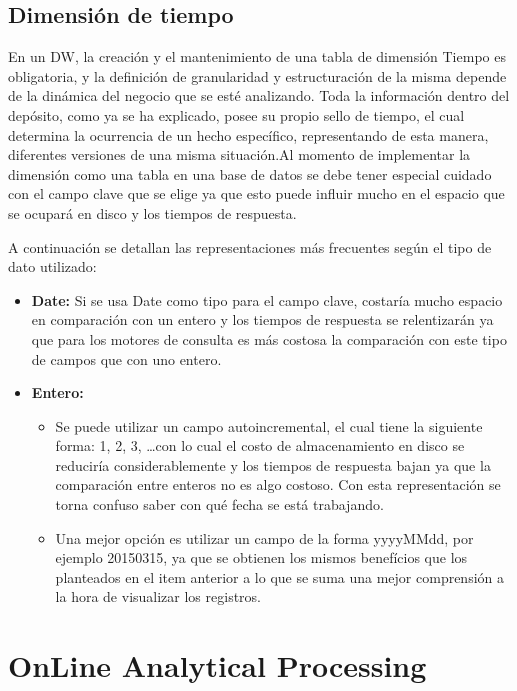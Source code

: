 \documentclass[a4paper,11pt]{article}
\begin{document}
\begin{flushleft}
    
    \subsection{Dimensión de tiempo}
    
    En un DW, la creación y el mantenimiento de una tabla de dimensión Tiempo es obligatoria, y la definición de granularidad y estructuración de la misma 
    depende de la dinámica del negocio que se esté analizando. Toda la información dentro del depósito, como ya se ha explicado, posee su propio sello de 
    tiempo, el cual determina la ocurrencia de un hecho específico, representando de esta manera, diferentes versiones de una misma situación.Al momento de 
    implementar la dimensión como una tabla en una base de datos se debe tener especial cuidado con el campo clave que se elige ya que esto puede influir 
    mucho en el espacio que se ocupará en disco y los tiempos de respuesta.\par
    
    A continuación se detallan las representaciones más frecuentes según el tipo de dato utilizado:
    
    \begin{itemize}
      \item \textbf{Date:} Si se usa Date como tipo para  el campo clave, costaría mucho espacio en comparación con un entero y los tiempos de respuesta se
      relentizarán ya que para los motores de consulta es más costosa la comparación con este tipo de campos que con uno entero.
      \item \textbf{Entero:}
      \begin{itemize}
        \item Se puede utilizar un campo autoincremental, el cual tiene la siguiente forma: 1, 2, 3, \dots con lo cual el costo de almacenamiento en disco
        se reduciría considerablemente y los tiempos de respuesta bajan ya que la comparación entre enteros no es algo costoso. Con esta representación se
        torna confuso saber con qué fecha se está trabajando.
        \item Una mejor opción es utilizar un campo de la forma yyyyMMdd, por ejemplo 20150315, ya que se obtienen los mismos benefícios que los planteados
        en el item anterior a lo que se suma una mejor comprensión a la hora de visualizar los registros.
      \end{itemize}
    \end{itemize}
    
    
    \section{OnLine Analytical Processing}
    

\end{flushleft}
\end{document}
